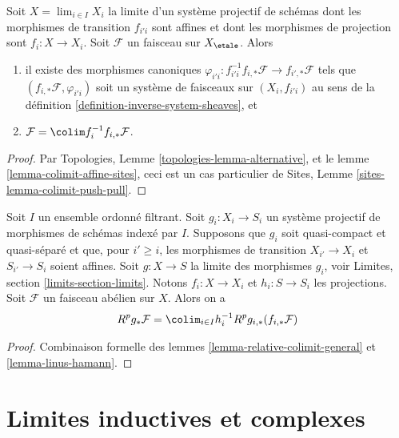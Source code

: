 \begin{lemma}
\label{lemma-linus-hamann}
Soit $X = \lim_{i \in I} X_i$ la limite d'un syst\`eme projectif de sch\'emas
dont les morphismes de transition $f_{i'i}$ sont affines et dont les morphismes de projection
sont $f_i : X \to X_i$. Soit $\mathcal{F}$ un faisceau sur $X_\etale$. Alors
\begin{enumerate}
\item il existe des morphismes canoniques
$\varphi_{i'i} : f_{i'i}^{-1}f_{i, *}\mathcal{F} \to f_{i', *}\mathcal{F}$
tels que $(f_{i, *}\mathcal{F}, \varphi_{i'i})$ soit un syst\`eme de
faisceaux sur $(X_i, f_{i'i})$ au sens de la
d\'efinition \ref{definition-inverse-system-sheaves}, et
\item $\mathcal{F} = \colim f_i^{-1}f_{i, *}\mathcal{F}$.
\end{enumerate}
\end{lemma}

\begin{proof}
Par Topologies, Lemme \ref{topologies-lemma-alternative}, et le
lemme \ref{lemma-colimit-affine-sites}, ceci est un cas particulier de
Sites, Lemme \ref{sites-lemma-colimit-push-pull}.
\end{proof}

\begin{lemma}
\label{lemma-compute-strangely}
Soit $I$ un ensemble ordonn\'e filtrant. Soit $g_i : X_i \to S_i$ un syst\`eme projectif de
morphismes de sch\'emas index\'e par $I$. Supposons que $g_i$ soit quasi-compact et
quasi-s\'epar\'e et que, pour $i' \geq i$, les morphismes de transition
$X_{i'} \to X_i$ et $S_{i'} \to S_i$ soient affines.
Soit $g : X \to S$ la limite des morphismes $g_i$, voir
Limites, section \ref{limits-section-limits}.
Notons $f_i : X \to X_i$ et $h_i : S \to S_i$ les projections.
Soit $\mathcal{F}$ un faisceau ab\'elien sur $X$. Alors on a
$$
R^pg_*\mathcal{F} = \colim_{i \in I} h_i^{-1}R^pg_{i, *}(f_{i, *}\mathcal{F})
$$
\end{lemma}

\begin{proof}
Combinaison formelle des lemmes \ref{lemma-relative-colimit-general}
et \ref{lemma-linus-hamann}.
\end{proof}











\section{Limites inductives et complexes}
\label{section-colimit-complexes}

